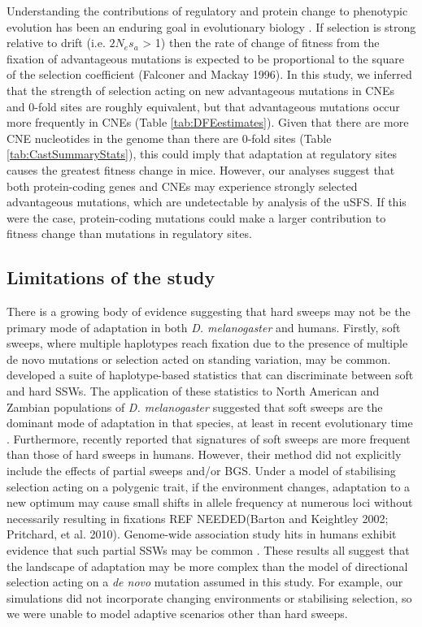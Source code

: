 	Understanding the contributions of regulatory and protein change to phenotypic evolution has been an enduring goal in evolutionary biology \cite{RN347, RN346, RN348}. If selection is strong relative to drift (i.e. $2N_es_a$ > 1) then the rate of change of fitness from the fixation of advantageous mutations is expected to be proportional to the square of the selection coefficient (Falconer and Mackay 1996). In this study, we inferred that the strength of selection acting on new advantageous mutations in CNEs and 0-fold sites are roughly equivalent, but that advantageous mutations occur more frequently in CNEs (Table \ref{tab:DFEestimates}). Given that there are more CNE nucleotides in the genome than there are 0-fold sites (Table \ref{tab:CastSummaryStats}), this could imply that adaptation at regulatory sites causes the greatest fitness change in mice. However, our analyses suggest that both protein-coding genes and CNEs may experience strongly selected advantageous mutations, which are undetectable by analysis of the uSFS. If this were the case, protein-coding mutations could make a larger contribution to fitness change than mutations in regulatory sites.

\subsection{Limitations of the study}

	There is a growing body of evidence suggesting that hard sweeps may not be the primary mode of adaptation in both \textit{D. melanogaster} and humans. Firstly, soft sweeps, where multiple haplotypes reach fixation due to the presence of multiple de novo mutations or selection acted on standing variation, may be common. \cite{RN208} developed a suite of haplotype-based statistics that can discriminate between soft and hard SSWs. The application of these statistics to North American and Zambian populations of \textit{D. melanogaster} suggested that soft sweeps are the dominant mode of adaptation in that species, at least in recent evolutionary time \citep{RN208,RN303}. Furthermore, \cite{RN337} recently reported that signatures of soft sweeps are more frequent than those of hard sweeps in humans. However, their method did not explicitly include the effects of partial sweeps and/or BGS. Under a model of stabilising selection acting on a polygenic trait, if the environment changes, adaptation to a new optimum may cause small shifts in allele frequency at numerous loci without necessarily resulting in fixations REF NEEDED(Barton and Keightley 2002; Pritchard, et al. 2010). Genome-wide association study hits in humans exhibit evidence that such partial SSWs may be common \citep{RN301}. These results all suggest that the landscape of adaptation may be more complex than the model of directional selection acting on a \textit{de novo} mutation assumed in this study. For example, our simulations did not incorporate changing environments or stabilising selection, so we were unable to model adaptive scenarios other than hard sweeps. 

